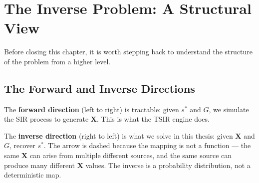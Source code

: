 \section{The Inverse Problem: A Structural View}
\label{sec:structural-view}

Before closing this chapter, it is worth stepping back to understand the
structure of the problem from a higher level.

\subsection{The Forward and Inverse Directions}

\begin{center}
\end{center}

The \textbf{forward direction} (left to right) is tractable: given $s^*$ and
$G$, we simulate the SIR process to generate $\mathbf{X}$. This is what the
TSIR engine does.

The \textbf{inverse direction} (right to left) is what we solve in this
thesis: given $\mathbf{X}$ and $G$, recover $s^*$. The arrow is dashed
because the mapping is not a function — the same $\mathbf{X}$ can arise from
multiple different sources, and the same source can produce many different
$\mathbf{X}$ values. The inverse is a probability distribution, not a
deterministic map.


